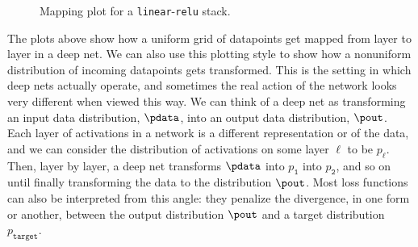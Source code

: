 \begin{figure}[h]
{
    }
    \caption{Mapping plot for a \texttt{linear}-\texttt{relu} stack.}
    \label{fig:neural_nets_as_distribution_transformers:new_way_plot_two_layer}
\end{figure}

The plots above show how a uniform grid of datapoints get mapped from layer to layer in a deep net. We can also use this plotting style to show how a nonuniform distribution of incoming datapoints gets transformed. This is the setting in which deep nets actually operate, and sometimes the real action of the network looks very different when viewed this way. We can think of a deep net as transforming an input data distribution, $\pdata$, into an output data distribution, $\pout$. Each layer of activations in a network is a different representation or  of the data, and we can consider the distribution of activations on some layer $\ell$ to be $p_{\ell}$. Then, layer by layer, a deep net transforms $\pdata$ into $p_{\texttt{1}}$ into $p_{\texttt{2}}$, and so on until finally transforming the data to the distribution $\pout$. Most loss functions can also be interpreted from this angle: they penalize the divergence, in one form or another, between the output distribution $\pout$ and a target distribution $p_{\texttt{target}}$.

